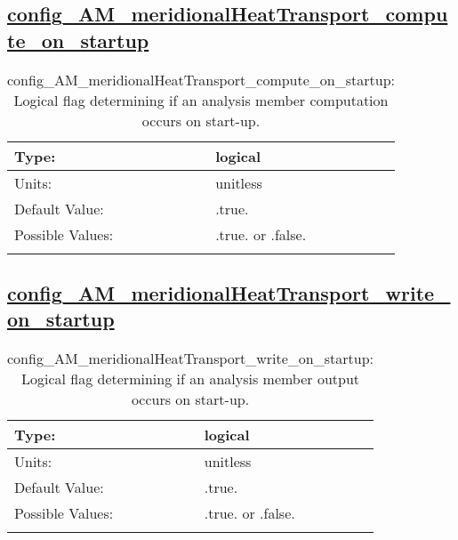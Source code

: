 \subsection[config\_AM\_meridionalHeatTransport\_compute\_on\_startup]{\hyperref[sec:nm_tab_AM_meridionalHeatTransport]{config\_AM\_meridionalHeatTransport\_compute\_on\_startup}}
\label{subsec:nm_sec_config_AM_meridionalHeatTransport_compute_on_startup}
\begin{center}
\begin{longtable}{| p{2.0in} || p{4.0in} |}
    \hline
    Type: & logical \\
    \hline
    Units: & \si{unitless} \\
    \hline
    Default Value: & .true. \\
    \hline
    Possible Values: & .true. or .false. \\
    \hline
    \caption{config\_AM\_meridionalHeatTransport\_compute\_on\_startup: Logical flag determining if an analysis member computation occurs on start-up.}
\end{longtable}
\end{center}
\subsection[config\_AM\_meridionalHeatTransport\_write\_on\_startup]{\hyperref[sec:nm_tab_AM_meridionalHeatTransport]{config\_AM\_meridionalHeatTransport\_write\_on\_startup}}
\label{subsec:nm_sec_config_AM_meridionalHeatTransport_write_on_startup}
\begin{center}
\begin{longtable}{| p{2.0in} || p{4.0in} |}
    \hline
    Type: & logical \\
    \hline
    Units: & \si{unitless} \\
    \hline
    Default Value: & .true. \\
    \hline
    Possible Values: & .true. or .false. \\
    \hline
    \caption{config\_AM\_meridionalHeatTransport\_write\_on\_startup: Logical flag determining if an analysis member output occurs on start-up.}
\end{longtable}
\end{center}
